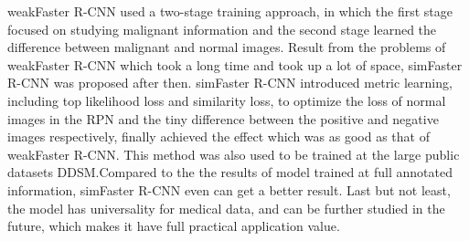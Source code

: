 weakFaster R-CNN used a two-stage training approach, in which the first stage focused on studying malignant information and the second stage learned the difference between malignant and normal images. Result from the problems of weakFaster R-CNN which took a long time and took up a lot of space, simFaster R-CNN was proposed after then.
simFaster R-CNN introduced metric learning, including top likelihood loss and similarity loss, to optimize the loss of normal images in the RPN and the tiny difference between the positive and negative images respectively, finally achieved the effect which was as good as that of weakFaster R-CNN. This method was also used to be trained at the large public datasets DDSM.Compared to the the results of model trained at full annotated information, simFaster R-CNN even can get a better result.
Last but not least, the model has universality for medical data, and can be further studied in the future, which makes it have full practical application value.

